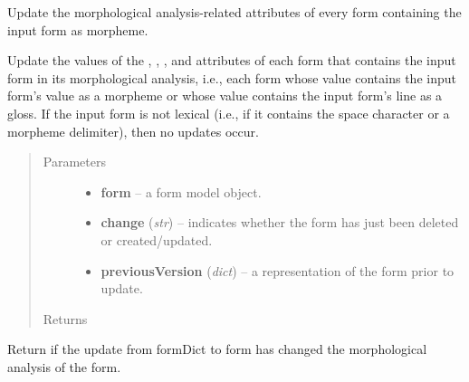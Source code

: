 \documentclass[letterpaper,10pt,english]{sphinxmanual}
\begin{document}
\begin{fulllineitems}
\label{api:onlinelinguisticdatabase.controllers.forms.updateFormsContainingThisFormAsMorpheme}
Update the morphological analysis-related attributes of every form containing the input form as morpheme.

Update the values of the , ,
, and  attributes of each
form that contains the input form in its morphological analysis, i.e., each
form whose  value contains the input form's
 value as a morpheme or whose  value
contains the input form's  line as a gloss.  If the input
form is not lexical (i.e., if it contains the space character or a
morpheme delimiter), then no updates occur.
\begin{quote}\begin{description}
\item[{Parameters}] \leavevmode\begin{itemize}
\item {} 
\textbf{form} -- a form model object.

\item {} 
\textbf{change} (\emph{str}) -- indicates whether the form has just been deleted or created/updated.

\item {} 
\textbf{previousVersion} (\emph{dict}) -- a representation of the form prior to update.

\end{itemize}

\item[{Returns}] \leavevmode
{}

\end{description}\end{quote}

\end{fulllineitems}


\begin{fulllineitems}
\label{api:onlinelinguisticdatabase.controllers.forms.updateHasChangedTheAnalysis}
Return  if the update from formDict to form has changed the morphological analysis of the form.

\end{fulllineitems}
\end{document}
